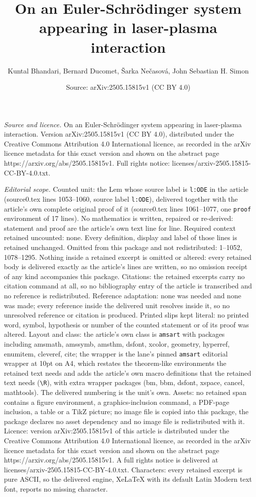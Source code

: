 \documentclass[10pt,a4paper]{amsart}
\title[On an Euler-Schr\"{o}dinger system appearing in laser-plasma]{On an Euler-Schr\"{o}dinger system appearing in laser-plasma interaction}
\author{Kuntal Bhandari, Bernard Ducomet, \v{S}arka Ne\v{c}asov\'a, John Sebastian H. Simon}
\date{Source: arXiv:2505.15815v1 (CC BY 4.0)}
\begin{document}
\maketitle

\noindent\emph{Source and licence.} On an Euler-Schr\"{o}dinger system appearing in laser-plasma interaction. Version arXiv:2505.15815v1 (CC BY 4.0), distributed under the Creative Commons Attribution 4.0 International licence, as recorded in the arXiv licence metadata for this exact version and shown on the abstract page https://arxiv.org/abs/2505.15815v1. Full rights notice: licenses/arxiv-2505.15815-CC-BY-4.0.txt.\par\smallskip

\noindent\textit{Editorial scope.} Counted unit: the Lem whose source label is \texttt{l:ODE} in the article (source0.tex lines 1053--1060, source label \texttt{l:ODE}), delivered together with the article's own complete original proof of it (source0.tex lines 1061--1077, one \texttt{proof} environment of 17 lines). No mathematics is written, repaired or re-derived: statement and proof are the article's own text line for line. Required context retained uncounted: none. Every definition, display and label of those lines is retained unchanged. Omitted from this package and not redistributed: 1--1052, 1078--1295. Nothing inside a retained excerpt is omitted or altered: every retained body is delivered exactly as the article's lines are written, so no omission receipt of any kind accompanies this package. Citations: the retained excerpts carry no citation command at all, so no bibliography entry of the article is transcribed and no reference is redistributed. Reference adaptation: none was needed and none was made; every reference inside the delivered unit resolves inside it, so no unresolved reference or citation is produced. Printed slips kept literal: no printed word, symbol, hypothesis or number of the counted statement or of its proof was altered. Layout and class: the article's own class is \texttt{amsart} with packages including amsmath, amssymb, amsthm, dsfont, xcolor, geometry, hyperref, enumitem, cleveref, cite; the wrapper is the lane's pinned \texttt{amsart} editorial wrapper at 10pt on A4, which restates the theorem-like environments the retained text needs and adds the article's own macro definitions that the retained text needs (\texttt{\textbackslash R}), with extra wrapper packages (bm, bbm, dsfont, xspace, cancel, mathtools). The delivered numbering is the unit's own. Assets: no retained span contains a figure environment, a graphics-inclusion command, a PDF-page inclusion, a table or a TikZ picture; no image file is copied into this package, the package declares no asset dependency and no image file is redistributed with it. Licence: version arXiv:2505.15815v1 of this article is distributed under the Creative Commons Attribution 4.0 International licence, as recorded in the arXiv licence metadata for this exact version and shown on the abstract page https://arxiv.org/abs/2505.15815v1. A full rights notice is delivered at licenses/arxiv-2505.15815-CC-BY-4.0.txt. Characters: every retained excerpt is pure ASCII, so the delivered engine, XeLaTeX with its default Latin Modern text font, reports no missing character.
\end{document}
